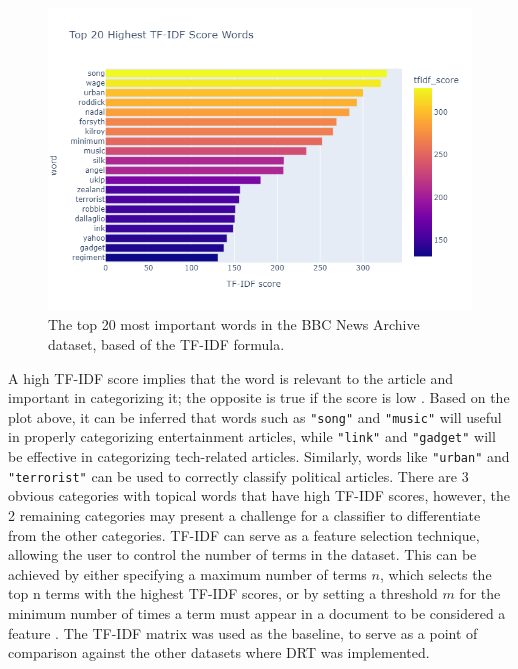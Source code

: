 \documentclass[12pt]{article}
\begin{document}
\begin{figure}[H]
  \centering
  \includegraphics[scale=0.55]{plots/tfidf.png}
  \caption{The top 20 most important words in the BBC News Archive dataset, based of the TF-IDF formula.}
\end{figure}

A high TF-IDF score implies that the word is relevant to the article and important in categorizing it; the opposite is true if the score is low \parencite{manning_raghavan_schütze_2009_tf}. Based on the plot above, it can be inferred that words such as \texttt{"song"} and \texttt{"music"} will useful in properly categorizing entertainment articles, while \texttt{"link"} and \texttt{"gadget"} will be effective in categorizing tech-related articles. Similarly, words like \texttt{"urban"} and \texttt{"terrorist"} can be used to correctly classify political articles. There are 3 obvious categories with topical words that have high TF-IDF scores, however, the 2 remaining categories may present a challenge for a classifier to differentiate from the other categories. TF-IDF can serve as a feature selection technique, allowing the user to control the number of terms in the dataset. This can be achieved by either specifying a maximum number of terms $n$, which selects the top n terms with the highest TF-IDF scores, or by setting a threshold $m$ for the minimum number of times a term must appear in a document to be considered a feature \parencite{manning_raghavan_schütze_2009_tf}. The TF-IDF matrix was used as the baseline, to serve as a point of comparison against the other datasets where DRT was implemented.


\end{document}
